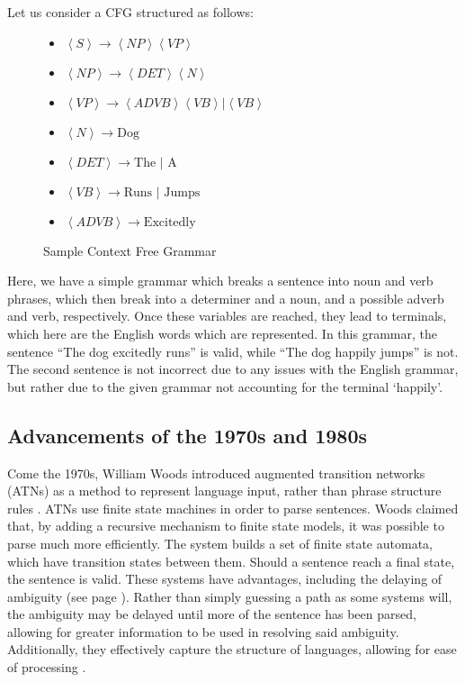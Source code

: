 Let us consider a CFG structured as follows:

\begin{center}
\begin{figure}[H]
\begin{center}

\begin{itemize}

	\item $\left<S\right> \rightarrow \left< NP \right> \left<VP\right>$
	\item $\left<NP\right> \rightarrow \left<DET\right> \left<N\right>$
	\item $\left<VP\right> \rightarrow \left<ADVB\right> \left<VB\right> | \left<VB\right>$
	\item $\left<N\right> \rightarrow \text{Dog}$
	\item $\left<DET\right> \rightarrow \text{The | A}$
	\item $\left<VB\right> \rightarrow \text{Runs | Jumps}$
	\item $\left<ADVB\right> \rightarrow \text{Excitedly}$

\end{itemize}
\end{center}
\caption{Sample Context Free Grammar}
\end{figure}
\end{center}


Here, we have a simple grammar which breaks a sentence into noun and verb phrases, which then break into a determiner and a noun, and a possible adverb and verb, respectively. Once these variables are reached, they lead to terminals, which here are the English words which are represented. In this grammar, the sentence ``The dog excitedly runs'' is valid, while ``The dog happily jumps'' is not. The second sentence is not incorrect due to any issues with the English grammar, but rather due to the given grammar not accounting for the terminal `happily'.



\subsection{Advancements of the 1970s and 1980s}

Come the 1970s, William Woods introduced augmented transition networks (ATNs) as a method to represent language input, rather than phrase structure rules \cite{Woods}. ATNs use finite state machines in order to parse sentences. Woods claimed that, by adding a recursive mechanism to finite state models, it was possible to parse much more efficiently. The system builds a set of finite state automata, which have transition states between them. Should a sentence reach a final state, the sentence is valid. These systems have advantages, including the delaying of ambiguity (see page \pageref{issues}). Rather than simply guessing a path as some systems will, the ambiguity may be delayed until more of the sentence has been parsed, allowing for greater information to be used in resolving said ambiguity. Additionally, they effectively capture the structure of languages, allowing for ease of processing \cite{Woods}.

